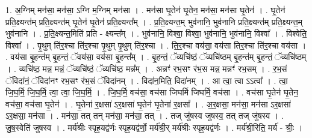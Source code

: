 \documentclass[17pt]{extarticle}
\begin{document}
1. अ॒ग्निम् मन॑सा॒ मन॑सा॒ ऽग्नि म॒ग्निम् मन॑सा । . मन॑सा घृ॒तेन॑ घृ॒तेन॒ मन॑सा॒ मन॑सा घृ॒तेन॑ । . घृ॒तेन॑ प्रति॒क्ष्यन्त॑म् प्रति॒क्ष्यन्त॑म् घृ॒तेन॑ घृ॒तेन॑ प्रति॒क्ष्यन्त᳚म् । . प्र॒ति॒क्ष्यन्त॒म् भुव॑नानि॒ भुव॑नानि प्रति॒क्ष्यन्त॑म् प्रति॒क्ष्यन्त॒म् भुव॑नानि । . प्र॒ति॒क्ष्यन्त॒मिति॑ प्रति - क्ष्यन्त᳚म् । . भुव॑नानि॒ विश्वा॒ विश्वा॒ भुव॑नानि॒ भुव॑नानि॒ विश्वा᳚ । . विश्वेति॒ विश्वा᳚ । . पृ॒थुम् ति॑र॒श्चा ति॑र॒श्चा पृ॒थुम् पृ॒थुम् ति॑र॒श्चा । . ति॒र॒श्चा वय॑सा॒ वय॑सा तिर॒श्चा ति॑र॒श्चा वय॑सा । . वय॑सा बृ॒हन्त॑म् बृ॒हन्तं॒ ॅवय॑सा॒ वय॑सा बृ॒हन्त᳚म् । . बृ॒हन्तं॒ ॅव्यचि॑ष्ठं॒ ॅव्यचि॑ष्ठम् बृ॒हन्त॑म् बृ॒हन्तं॒ ॅव्यचि॑ष्ठम् । . व्यचि॑ष्ठ॒ मन्न॒ मन्नं॒ ॅव्यचि॑ष्ठं॒ ॅव्यचि॑ष्ठ॒ मन्न᳚म् । . अन्नꣳ॑ रभ॒सꣳ र॑भ॒स मन्न॒ मन्नꣳ॑ रभ॒सम् । . र॒भ॒सं ॅविदा॑नं॒ ॅविदा॑नꣳ रभ॒सꣳ र॑भ॒सं ॅविदा॑नम् । . विदा॑न॒मिति॒ विदा॑नम् । . आ त्वा॒ त्वा ऽऽत्वा᳚ । . त्वा॒ जि॒घ॒र्मि॒ जि॒घ॒र्मि॒ त्वा॒ त्वा॒ जि॒घ॒र्मि॒ । . जि॒घ॒र्मि॒ वच॑सा॒ वच॑सा जिघर्मि जिघर्मि॒ वच॑सा । . वच॑सा घृ॒तेन॑ घृ॒तेन॒ वच॑सा॒ वच॑सा घृ॒तेन॑ । . घृ॒तेना॑ र॒क्षसा॑ ऽर॒क्षसा॑ घृ॒तेन॑ घृ॒तेना॑ र॒क्षसा᳚ । . अ॒र॒क्षसा॒ मन॑सा॒ मन॑सा ऽर॒क्षसा॑ ऽर॒क्षसा॒ मन॑सा । . मन॑सा॒ तत् तन् मन॑सा॒ मन॑सा॒ तत् । . तज् जु॑षस्व जुषस्व॒ तत् तज् जु॑षस्व । . जु॒ष॒स्वेति॑ जुषस्व । . मर्य॑श्रीः स्पृह॒यद्व॑र्णः स्पृह॒यद्व॑र्णो॒ मर्य॑श्री॒र् मर्य॑श्रीः स्पृह॒यद्व॑र्णः । . मर्य॑श्री॒रिति॒ मर्य॑ - श्रीः॒ । \newline
\end{document}
